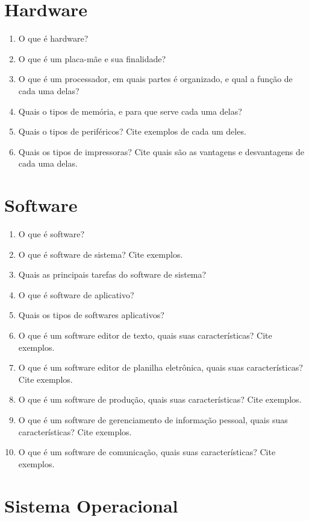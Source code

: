\documentclass[11pt]{article}
\begin{document}
	\newpage
	\section{Hardware}
	
	\begin{enumerate}
		\item O que é hardware?
		\item O que é um placa-mãe e sua finalidade?
		\item O que é um processador, em quais partes é organizado, e qual a fun\c cão de cada uma delas?
		\item Quais o tipos de memória, e para que serve cada uma delas?
		\item Quais o tipos de periféricos? Cite exemplos de cada um deles.
		\item Quais os tipos de impressoras? Cite quais são as vantagens e desvantagens de cada uma delas.
	\end{enumerate}

	\newpage
	\section{Software}
	
	\begin{enumerate}
		\item O que é software?
		\item O que é software de sistema? Cite exemplos.
		\item Quais as principais tarefas do software de sistema?
		\item O que é software de aplicativo?
		\item Quais os tipos de softwares aplicativos?
		\item O que é um software editor de texto, quais suas características? Cite exemplos.
		\item O que é um software editor de planilha eletrônica, quais suas características? Cite exemplos.
		\item O que é um software de produção, quais suas características? Cite exemplos.
		\item O que é um software de gerenciamento de informação pessoal, quais suas características? Cite exemplos.
		\item O que é um software de comunicação, quais suas características? Cite exemplos.
	\end{enumerate}

	\newpage
	\section{Sistema Operacional}
	
\end{document}
